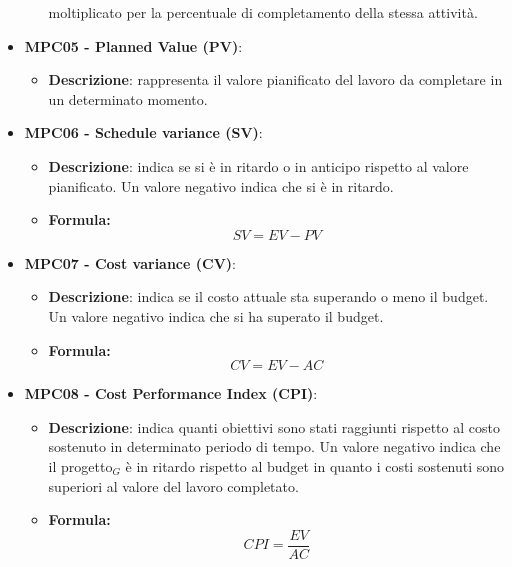 \documentclass[10pt]{article}
\begin{document}
\begin{justify}
\begin{itemize}
\begin{itemize}
            moltiplicato per la percentuale di completamento della stessa attività.
        \end{itemize}
    \item \textbf{MPC05 - Planned Value (PV)}:
        \begin{itemize}
            \item \textbf{Descrizione}: rappresenta il valore pianificato del lavoro da completare in un determinato momento.
        \end{itemize}
    \item \textbf{MPC06 - Schedule variance (SV)}:
    \begin{itemize}
        \item   \textbf{Descrizione}: indica se si è in ritardo o in anticipo rispetto al valore pianificato. Un valore negativo indica che si è in ritardo.
        \item   \textbf{Formula:}
            \[
            SV = EV - PV
            \]
    \end{itemize}
    \item \textbf{MPC07 - Cost variance (CV)}:
    \begin{itemize}
        \item   \textbf{Descrizione}: indica se il costo attuale sta superando o meno il budget. Un valore negativo indica che si ha superato il budget.
        \item   \textbf{Formula:}
            \[
            CV = EV - AC
            \]
    \end{itemize}
    \item \textbf{MPC08 - Cost Performance Index (CPI)}:
    \begin{itemize}
        \item   \textbf{Descrizione}: indica quanti obiettivi sono stati raggiunti rispetto al costo sostenuto in determinato periodo di tempo. Un valore negativo indica che il progetto$_G$ è in ritardo rispetto al budget in quanto i costi sostenuti sono superiori al valore del lavoro completato.
        \item   \textbf{Formula:}
            \[
            CPI = \frac{EV}{AC}
            \]
    \end{itemize}
\end{itemize}


\end{justify}
\end{document}
